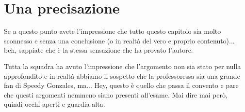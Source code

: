 \documentclass[class=book, crop=false, oneside, 12pt]{standalone}
\begin{document}
\section*{Una precisazione}
Se a questo punto avete l'impressione che tutto questo capitolo sia molto sconnesso e senza una conclusione (o in realtà del vero e proprio contenuto)... beh, sappiate che è la stessa sensazione che ha provato l'autore. 

Tutta la squadra ha avuto l'impressione che l'argomento non sia stato per nulla approfondito e in realtà abbiamo il sospetto che la professoressa sia una grande fan di Speedy Gonzales, ma... Hey, questo è quello che passa il convento e pare che questi argomenti nemmeno siano presenti all'esame. Mai dire mai però, quindi occhi aperti e guardia alta.
\end{document}
